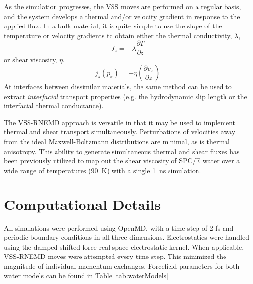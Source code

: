 As the simulation progresses, the VSS moves are performed on a regular
basis, and the system develops a thermal and/or velocity gradient in
response to the applied flux.  In a bulk material, it is quite simple
to use the slope of the temperature or velocity gradients to obtain
either the thermal conductivity, $\lambda$,
\begin{equation}
J_z = -\lambda \frac{\partial T}{\partial z}
\end{equation}
 or shear viscosity,
$\eta$.\cite{Bordat2002a}
\begin{equation}
\label{eq:viscosity}
j_z(p_x) = -\eta \left(\frac{\partial v_x}{\partial z}\right)
\end{equation}
At interfaces between dissimilar materials, the same method can be
used to extract \textit{interfacial} transport properties (e.g. the
hydrodynamic slip length or the interfacial thermal
conductance).


The VSS-RNEMD approach is versatile in that it may be used to
implement thermal and shear transport simultaneously.  Perturbations
of velocities away from the ideal Maxwell-Boltzmann distributions are
minimal, as is thermal anisotropy.  This ability to generate
simultaneous thermal and shear fluxes has been previously utilized to
map out the shear viscosity of SPC/E water over a wide range of
temperatures (90~K) with a single 1~ns simulation.\cite{Kuang2012}


\section{Computational Details}
All simulations were performed using OpenMD,\cite{OOPSE,openmd} with a
time step of 2 fs and periodic boundary conditions in all three
dimensions.  Electrostatics were handled using the damped-shifted
force real-space electrostatic kernel.\cite{Ewald} When applicable,
VSS-RNEMD moves were attempted every time step. This minimized the
magnitude of individual momentum exchanges.  Forcefield parameters for
both water models can be found in Table \ref{tab:waterModels}.

